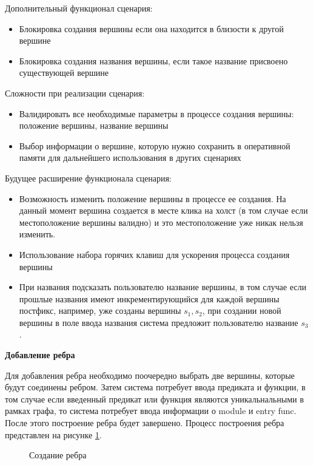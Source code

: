 Дополнительный функционал сценария:
\begin{itemize}
	\item Блокировка создания вершины если она находится в близости к другой вершине
	\item Блокировка создания названия вершины, если такое название присвоено существующей вершине
\end{itemize}

Сложности при реализации сценария:
\begin{itemize}
	\item Валидировать все необходимые параметры в процессе создания вершины: положение вершины, название вершины
	\item Выбор информации о вершине, которую нужно сохранить в оперативной памяти для дальнейшего использования в других сценариях
\end{itemize}

Будущее расширение функционала сценария:
\begin{itemize}
	\item Возможность изменить положение вершины в процессе ее создания. На данный момент вершина создается в месте клика на холст (в том случае если местоположение вершины валидно) и это местоположение уже никак нельзя изменить.
	\item Использование набора горячих клавиш для ускорения процесса создания вершины
	\item При  названия подсказать пользователю название вершины, в том случае если прошлые названия имеют инкрементирующийся для каждой вершины постфикс, например, уже созданы вершины $s_1, s_2$, при создании новой вершины в поле ввода названия система предложит пользователю название $s_3$.
\end{itemize}

\textbf{Добавление ребра}

Для добавления ребра необходимо поочередно выбрать две вершины, которые будут соединены ребром. Затем система потребует ввода предиката и функции, в том случае если введенный предикат или функция являются уникальнальными в рамках графа, то система потребует ввода информации о module и entry func. После этого построение ребра будет завершено. Процесс построения ребра представлен на рисунке \ref{fig:edge_create}.

\begin{figure}[h!]
\caption{Создание ребра}
\label{fig:edge_create}
\end{figure}

